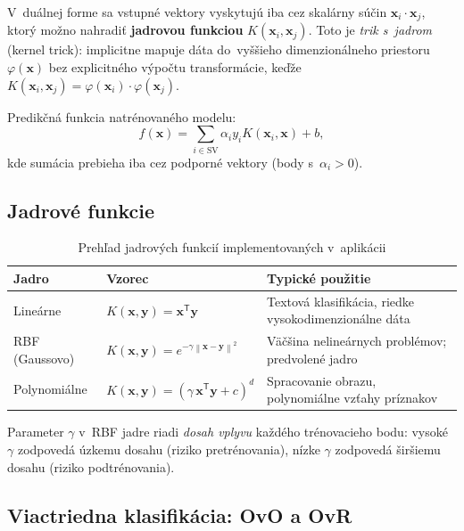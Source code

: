 \documentclass[12pt,a4paper]{article}
\newcommand{\norm}[1]{\left\lVert#1\right\rVert}
\newcommand{\T}{\mathsf{T}}
\begin{document}
V~duálnej forme sa vstupné vektory vyskytujú iba cez skalárny súčin
$\mathbf{x}_i \cdot \mathbf{x}_j$, ktorý možno nahradiť \textbf{jadrovou
funkciou} $K(\mathbf{x}_i, \mathbf{x}_j)$. Toto je \emph{trik s~jadrom}
(kernel trick): implicitne mapuje dáta do~vyššieho dimenzionálneho priestoru
$\varphi(\mathbf{x})$ bez explicitného výpočtu transformácie, keďže
$K(\mathbf{x}_i, \mathbf{x}_j) = \varphi(\mathbf{x}_i)\cdot\varphi(\mathbf{x}_j)$.

Predikčná funkcia natrénovaného modelu:
\begin{equation}
  f(\mathbf{x}) = \sum_{i \in \mathrm{SV}} \alpha_i y_i
  K(\mathbf{x}_i, \mathbf{x}) + b,
\end{equation}
kde sumácia prebieha iba cez podporné vektory (body s~$\alpha_i > 0$).

\subsection{Jadrové funkcie}

\begin{table}[H]
  \centering
  \caption{Prehľad jadrových funkcií implementovaných v~aplikácii}
  \begin{tabular}{llp{5.8cm}}
    \toprule
    \textbf{Jadro} & \textbf{Vzorec} & \textbf{Typické použitie} \\
    \midrule
    Lineárne
      & $K(\mathbf{x},\mathbf{y}) = \mathbf{x}^{\T}\mathbf{y}$
      & Textová klasifikácia, riedke vysokodimenzionálne dáta \\[4pt]
    RBF (Gaussovo)
      & $K(\mathbf{x},\mathbf{y}) = e^{-\gamma\norm{\mathbf{x}-\mathbf{y}}^2}$
      & Väčšina nelineárnych problémov; predvolené jadro \\[4pt]
    Polynomiálne
      & $K(\mathbf{x},\mathbf{y}) = (\gamma\,\mathbf{x}^{\T}\mathbf{y}+c)^d$
      & Spracovanie obrazu, polynomiálne vzťahy príznakov \\
    \bottomrule
  \end{tabular}
  \label{tab:jadra}
\end{table}

Parameter $\gamma$ v~RBF jadre riadi \emph{dosah vplyvu} každého
trénovacieho bodu: vysoké $\gamma$ zodpovedá úzkemu dosahu (riziko
pretrénovania), nízke $\gamma$ zodpovedá širšiemu dosahu (riziko
podtrénovania).

\subsection{Viactriedna klasifikácia: OvO a OvR}
\end{document}
